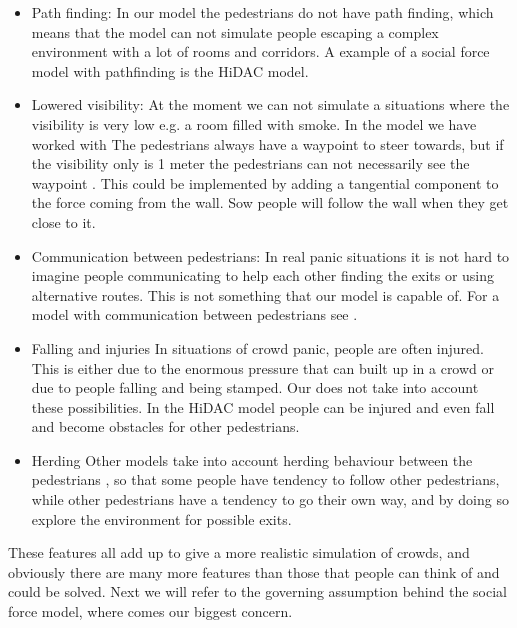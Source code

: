 \begin{itemize}
\item {Path finding: } 
In our model the pedestrians do not have path finding, which means that the model 
can not simulate people escaping a complex environment with a lot of rooms 
and corridors. A example of a social force model with pathfinding is the HiDAC 
model\cite{HiDAC}.

\item {Lowered visibility: }
At the moment we can not simulate a situations where the visibility is very low 
e.g. a room filled with smoke. In the model we have worked with The pedestrians always 
have a waypoint to steer towards, but if the visibility only is 1 meter the 
pedestrians can not necessarily see the waypoint \cite{HelbingNew}. This could be 
implemented by adding a tangential component to the force coming from the wall. 
Sow people will follow the wall when they get close to it.

\item {Communication between pedestrians: }
In real panic situations it is not hard to imagine people communicating to help each 
other finding the exits or using alternative routes. This is 
not something that our model is capable of. For a model with communication between 
pedestrians see \cite{HiDAC}.

\item {Falling and injuries }
In situations of crowd panic, people are often injured. This is either due to the 
enormous pressure that can built up in a crowd or due to people falling and being stamped. Our 
does not take into account these possibilities. In the HiDAC model people can 
be injured and even fall and become obstacles for other pedestrians.\cite{HiDAC}

\item {Herding}
Other models take into account herding behaviour between the pedestrians 
\cite{helbing00}, so that some people have tendency to follow other pedestrians, 
while other pedestrians have a tendency to go their own way,  and by doing so 
explore the environment for possible exits.

\end{itemize}

These features all add up to give a more realistic simulation of crowds, and 
obviously there are many more features than those that people can think of 
and could be solved. 
Next we will refer to the governing assumption behind the social force
model, where comes our biggest concern.

